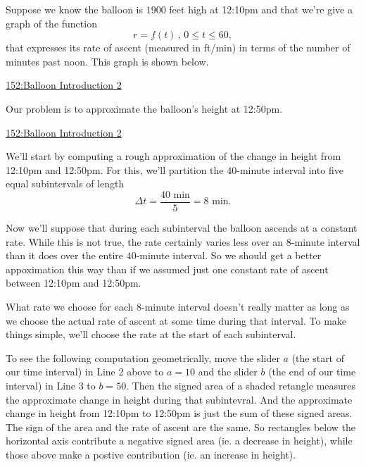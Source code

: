 \documentclass{ximera}
\begin{document}
\begin{example}  \label{Ex:98dfrghha}
Suppose we know the balloon is $1900$ feet high at 12:10pm and that we're give a graph of the function
\[
    r = f(t) \, , \, 0\leq t \leq  60 , 
\]
that expresses its rate of ascent (measured in ft/min) in terms of the number of minutes past noon. This graph is shown below.

\begin{onlineOnly}
    \begin{center}
\end{center}
\end{onlineOnly}

\href{https://www.desmos.com/calculator/h6cworakdw}{152:Balloon Introduction 2}

Our problem is to approximate the balloon's height at 12:50pm.


\begin{onlineOnly}
    \begin{center}
\end{center}
\end{onlineOnly}

\href{https://www.desmos.com/calculator/h6cworakdw}{152:Balloon Introduction 2}

We'll start by computing a rough approximation of the change in height from 12:10pm and 12:50pm. For this, we'll partition the $40$-minute interval into five equal subintervals of length 
\[
  \Delta t = \frac{40\text{ min}}{5} = 8 \text{ min}.
\]
 
Now we'll suppose that during each subinterval the balloon ascends at a constant rate. While this is not true, the rate certainly varies less over an $8$-minute interval than it does over the entire $40$-minute interval. So we should get a better appoximation  this way than if we assumed just one constant rate of ascent between 12:10pm and 12:50pm.

What rate we choose for each $8$-minute interval doesn't really matter as long as we choose the actual rate of ascent at some time during that interval. To make things simple, we'll choose the rate at the start of each subinterval. 

To see the following computation geometrically, move the slider $a$ (the start of our time interval) in Line 2 above to $a=10$ and the slider $b$ (the end of our time interval) in Line 3 to $b=50$. Then the signed area of a shaded retangle measures the approximate change in height during that subintevral. And the approximate change in height from 12:10pm to 12:50pm is just the sum of these signed areas. The sign of the area and the rate of ascent are the same. So rectangles below the horizontal axis contribute a negative signed area (ie. a decrease in height), while those above make a postive contribution (ie. an increase in height).


\end{example}
\end{document}
